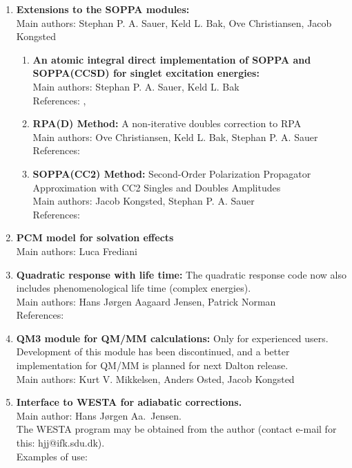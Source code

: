 \begin{enumerate}
\item{\bf Extensions to the SOPPA modules:} \\
Main authors: Stephan P. A. Sauer, Keld L. Bak, Ove Christiansen, Jacob Kongsted
\begin{enumerate}
  \item{\bf An atomic integral direct implementation of SOPPA and SOPPA(CCSD) for singlet excitation energies:}  \\
   Main authors: Stephan P. A. Sauer, Keld L. Bak \\
   References: \cite{spas037},
   \cite{spas089}
  \item{\bf RPA(D) Method:}
  A non-iterative doubles correction to RPA\\
   Main authors: Ove Christiansen, Keld L. Bak, Stephan P. A. Sauer \\
   References: \cite{spas025}
  \item{\bf SOPPA(CC2) Method:}
   Second-Order Polarization Propagator Approximation with CC2 Singles and Doubles
   Amplitudes\\
   Main authors: Jacob Kongsted, Stephan P. A. Sauer \\
   References: \cite{spas097}
\end{enumerate}

\item{\bf PCM model for solvation effects} \\
Main authors: Luca Frediani

\item{\bf Quadratic response with life time:} The quadratic response code now also
includes phenomenological life time (complex energies).  \\
Main authors: Hans J\o rgen Aagaard Jensen, Patrick Norman \\
References: \cite{pndmbhjajjojcp123}

\item{\bf QM3 module for QM/MM calculations:} Only for experienced users. Development of this module has been discontinued,
and a better implementation for QM/MM is planned for next Dalton release.  \\
Main authors: Kurt V. Mikkelsen, Anders Osted, Jacob Kongsted

\item{\bf Interface to WESTA for adiabatic corrections.}  \\
Main author: Hans J\o rgen Aa.\ Jensen.\\
 The WESTA program may be obtained from the author
 (contact e-mail for this: hjj@ifk.sdu.dk).\\
 Examples of use:


\end{enumerate}
